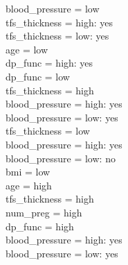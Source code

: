 \documentclass[12pt]{article}
\begin{document}
\textbar\quad \textbar\quad \textbar\quad \textbar\quad \textbar\quad \textbar\quad blood\_pressure = low\\
\textbar\quad \textbar\quad \textbar\quad \textbar\quad \textbar\quad \textbar\quad \textbar\quad tfs\_thickness = high: yes\\
\textbar\quad \textbar\quad \textbar\quad \textbar\quad \textbar\quad \textbar\quad \textbar\quad tfs\_thickness = low: yes\\
\textbar\quad \textbar\quad \textbar\quad \textbar\quad age = low\\
\textbar\quad \textbar\quad \textbar\quad \textbar\quad \textbar\quad dp\_func = high: yes\\
\textbar\quad \textbar\quad \textbar\quad \textbar\quad \textbar\quad dp\_func = low\\
\textbar\quad \textbar\quad \textbar\quad \textbar\quad \textbar\quad \textbar\quad tfs\_thickness = high\\
\textbar\quad \textbar\quad \textbar\quad \textbar\quad \textbar\quad \textbar\quad \textbar\quad blood\_pressure = high: yes\\
\textbar\quad \textbar\quad \textbar\quad \textbar\quad \textbar\quad \textbar\quad \textbar\quad blood\_pressure = low: yes\\
\textbar\quad \textbar\quad \textbar\quad \textbar\quad \textbar\quad \textbar\quad tfs\_thickness = low\\
\textbar\quad \textbar\quad \textbar\quad \textbar\quad \textbar\quad \textbar\quad \textbar\quad blood\_pressure = high: yes\\
\textbar\quad \textbar\quad \textbar\quad \textbar\quad \textbar\quad \textbar\quad \textbar\quad blood\_pressure = low: no\\
\textbar\quad \textbar\quad bmi = low\\
\textbar\quad \textbar\quad \textbar\quad age = high\\
\textbar\quad \textbar\quad \textbar\quad \textbar\quad tfs\_thickness = high\\
\textbar\quad \textbar\quad \textbar\quad \textbar\quad \textbar\quad num\_preg = high\\
\textbar\quad \textbar\quad \textbar\quad \textbar\quad \textbar\quad \textbar\quad dp\_func = high\\
\textbar\quad \textbar\quad \textbar\quad \textbar\quad \textbar\quad \textbar\quad \textbar\quad blood\_pressure = high: yes\\
\textbar\quad \textbar\quad \textbar\quad \textbar\quad \textbar\quad \textbar\quad \textbar\quad blood\_pressure = low: yes\\
\end{document}
